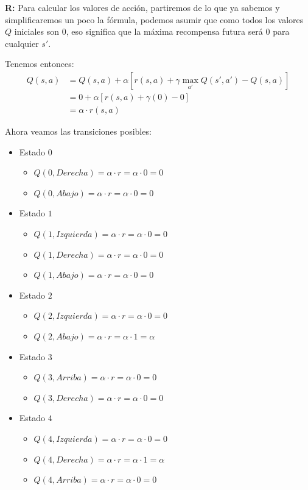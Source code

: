 \textbf{R:} Para calcular los valores de acción, partiremos de lo que ya sabemos y simplificaremos un poco la fórmula, podemos asumir que como todos los valores $Q$ iniciales son $0$, eso significa que la máxima recompensa futura será $0$ para cualquier $s'$.

Tenemos entonces:
\begin{align*}
    Q(s, a) &= Q(s, a) + \alpha [r(s,a) + \gamma \max_{a'} Q(s', a') - Q(s, a)] \\
    &= 0 + \alpha [r(s,a) + \gamma(0) - 0] \\
    &= \alpha \cdot r(s,a)
\end{align*}

Ahora veamos las transiciones posibles:
\begin{itemize}
    \item Estado $0$
          \begin{itemize}
              \item $Q(0, Derecha) = \alpha \cdot r = \alpha \cdot 0 = 0$
              \item $Q(0, Abajo) = \alpha \cdot r = \alpha \cdot 0 = 0$
          \end{itemize}

    \item Estado $1$
          \begin{itemize}
                \item $Q(1, Izquierda) = \alpha \cdot r = \alpha \cdot 0 = 0$
                \item $Q(1, Derecha) = \alpha \cdot r = \alpha \cdot 0 = 0$
                \item $Q(1, Abajo) = \alpha \cdot r = \alpha \cdot 0 = 0$  
          \end{itemize}
    \item Estado $2$
            \begin{itemize}
                \item $Q(2, Izquierda) = \alpha \cdot r = \alpha \cdot 0 = 0$
                \item $Q(2, Abajo) = \alpha \cdot r = \alpha \cdot 1 = \alpha$
            \end{itemize}
    \item Estado $3$
            \begin{itemize}
                \item $Q(3, Arriba) = \alpha \cdot r = \alpha \cdot 0 = 0$
                \item $Q(3, Derecha) = \alpha \cdot r = \alpha \cdot 0 = 0$
            \end{itemize}
    \item Estado $4$
            \begin{itemize}
                \item $Q(4, Izquierda) = \alpha \cdot r = \alpha \cdot 0 = 0$
                \item $Q(4, Derecha) = \alpha \cdot r = \alpha \cdot 1 = \alpha$
                \item $Q(4, Arriba) = \alpha \cdot r = \alpha \cdot 0 = 0$
            \end{itemize}
\end{itemize}

